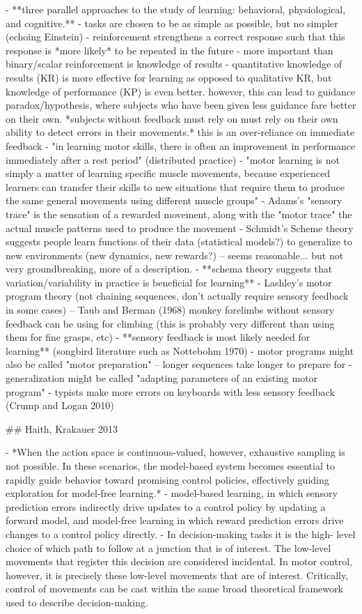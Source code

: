 \documentclass[../main.tex]{subfiles}
\begin{document}
{{- **three parallel approaches to the study of learning: behavioral, physiological, and cognitive.**
- tasks are chosen to be as simple as possible, but no simpler (echoing Einstein)
- reinforcement strengthens a correct response such that this response is *more likely* to be repeated in the future
- more important than binary/scalar reinforcement is knowledge of results
- quantitative knowledge of results (KR) is more effective for learning as opposed to qualitative KR, but knowledge of performance (KP) is even better. however, this can lead to guidance paradox/hypothesis, where subjects who have been given less guidance fare better on their own. *subjects without feedback must rely on must rely on their own ability to detect errors in their movements.* this is an over-reliance on immediate feedback
- "in learning motor skills, there is often an improvement in performance immediately after a rest period" (distributed practice)
- "motor learning is not simply a matter of learning specific muscle movements, because experienced learners can transfer their skills to new situations that require them to produce the same general movements using different muscle groups"
- Adams's "sensory trace" is the sensation of a rewarded movement, along with the "motor trace" the actual muscle patterns used to produce the movement
- Schmidt's Scheme theory suggests people learn functions of their data (statistical models?) to generalize to new environments (new dynamics, new rewards?) -- seems reasonable... but not very groundbreaking, more of a description.
- **schema theory suggests that variation/variability in practice is beneficial for learning**
- Lashley's motor program theory (not chaining sequences, don't actually require sensory feedback in some cases) -- Taub and Berman (1968) monkey forelimbs without sensory feedback can be using for climbing (this is probably very different than using them for fine grasps, etc)
- **sensory feedback is most likely needed for learning** (songbird literature such as Nottebohm 1970)
- motor programs might also be called "motor preparation" -- longer sequences take longer to prepare for
- generalization might be called "adapting parameters of an existing motor program"
- typists make more errors on keyboards with less sensory feedback (Crump and Logan 2010)

## Haith, Krakauer 2013

- *When the action space is continuous-valued, however, exhaustive sampling is not possible. In these scenarios, the model-based system becomes essential to rapidly guide behavior toward promising control policies, effectively guiding exploration for model-free learning.*
- model-based learning, in which sensory prediction errors indirectly drive updates to a control policy by updating a forward model, and model-free learning in which reward prediction errors drive changes to a control policy directly.
- In decision-making tasks it is the high- level choice of which path to follow at a junction that is of interest. The low-level movements that register this decision are considered incidental. In motor control, however, it is precisely these low-level movements that are of interest. Critically, control of movements can be cast within the same broad theoretical framework used to describe decision-making.

}}
\end{document}
